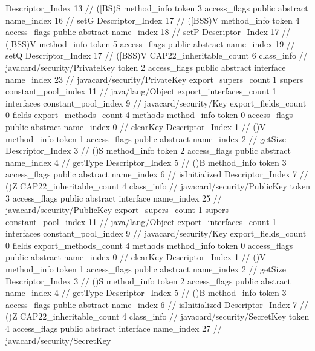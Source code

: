 {{{{{					Descriptor_Index	13		// ([BS)S
				}
				method_info {
					token	3
					access_flags	public abstract
					name_index	16		// setG
					Descriptor_Index	17		// ([BSS)V
				}
				method_info {
					token	4
					access_flags	public abstract
					name_index	18		// setP
					Descriptor_Index	17		// ([BSS)V
				}
				method_info {
					token	5
					access_flags	public abstract
					name_index	19		// setQ
					Descriptor_Index	17		// ([BSS)V
				}
			}
			CAP22_inheritable_count	6
		}
		class_info {		// javacard/security/PrivateKey
			token	2
			access_flags	public abstract interface
			name_index	23		// javacard/security/PrivateKey
			export_supers_count	1
			supers {
				constant_pool_index	11		// java/lang/Object
			}
			export_interfaces_count	1
			interfaces {
				constant_pool_index	9		// javacard/security/Key
			}
			export_fields_count	0
			fields {
			}
			export_methods_count	4
			methods {
				method_info {
					token	0
					access_flags	public abstract
					name_index	0		// clearKey
					Descriptor_Index	1		// ()V
				}
				method_info {
					token	1
					access_flags	public abstract
					name_index	2		// getSize
					Descriptor_Index	3		// ()S
				}
				method_info {
					token	2
					access_flags	public abstract
					name_index	4		// getType
					Descriptor_Index	5		// ()B
				}
				method_info {
					token	3
					access_flags	public abstract
					name_index	6		// isInitialized
					Descriptor_Index	7		// ()Z
				}
			}
			CAP22_inheritable_count	4
		}
		class_info {		// javacard/security/PublicKey
			token	3
			access_flags	public abstract interface
			name_index	25		// javacard/security/PublicKey
			export_supers_count	1
			supers {
				constant_pool_index	11		// java/lang/Object
			}
			export_interfaces_count	1
			interfaces {
				constant_pool_index	9		// javacard/security/Key
			}
			export_fields_count	0
			fields {
			}
			export_methods_count	4
			methods {
				method_info {
					token	0
					access_flags	public abstract
					name_index	0		// clearKey
					Descriptor_Index	1		// ()V
				}
				method_info {
					token	1
					access_flags	public abstract
					name_index	2		// getSize
					Descriptor_Index	3		// ()S
				}
				method_info {
					token	2
					access_flags	public abstract
					name_index	4		// getType
					Descriptor_Index	5		// ()B
				}
				method_info {
					token	3
					access_flags	public abstract
					name_index	6		// isInitialized
					Descriptor_Index	7		// ()Z
				}
			}
			CAP22_inheritable_count	4
		}
		class_info {		// javacard/security/SecretKey
			token	4
			access_flags	public abstract interface
			name_index	27		// javacard/security/SecretKey
}}}
